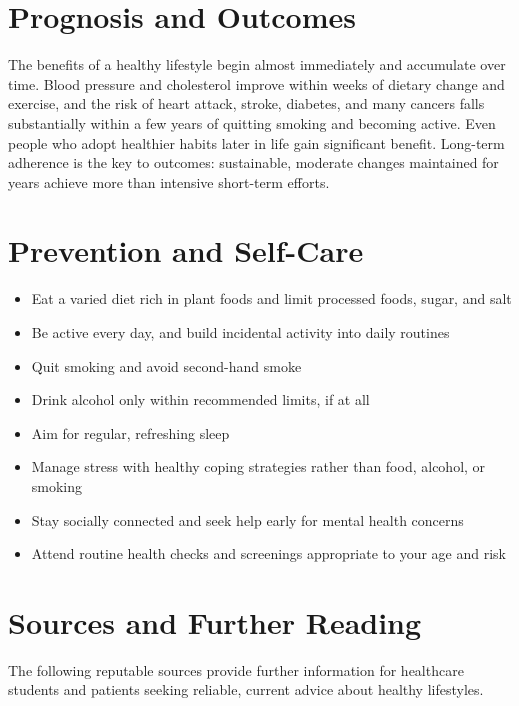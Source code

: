 \section*{Prognosis and Outcomes}
The benefits of a healthy lifestyle begin almost immediately and accumulate over time. Blood pressure and cholesterol improve within weeks of dietary change and exercise, and the risk of heart attack, stroke, diabetes, and many cancers falls substantially within a few years of quitting smoking and becoming active. Even people who adopt healthier habits later in life gain significant benefit. Long-term adherence is the key to outcomes: sustainable, moderate changes maintained for years achieve more than intensive short-term efforts.

\section*{Prevention and Self-Care}
\begin{itemize}
    \item Eat a varied diet rich in plant foods and limit processed foods, sugar, and salt
    \item Be active every day, and build incidental activity into daily routines
    \item Quit smoking and avoid second-hand smoke
    \item Drink alcohol only within recommended limits, if at all
    \item Aim for regular, refreshing sleep
    \item Manage stress with healthy coping strategies rather than food, alcohol, or smoking
    \item Stay socially connected and seek help early for mental health concerns
    \item Attend routine health checks and screenings appropriate to your age and risk
\end{itemize}

\section*{Sources and Further Reading}
The following reputable sources provide further information for healthcare students and patients seeking reliable, current advice about healthy lifestyles.

